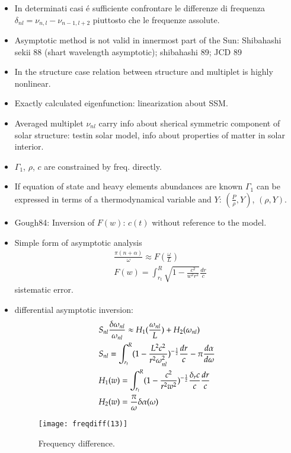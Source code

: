 \documentclass[oneside,12pt,fleqn]{memoir}
\begin{document}
\begin{itemize}
    \item In determinati casi \'e sufficiente confrontare le differenze di frequenza $\delta_{nl}=\nu_{n,l}-\nu_{n-1,l+2}$ piuttosto che le frequenze assolute.
    
    \item Asymptotic method is not valid in innermost part of the Sun: Shibahashi sekii 88 (shart wavelength asymptotic); shibahashi 89; JCD 89 
    
    \item In the structure case relation between structure and multiplet is highly nonlinear.
    \item Exactly calculated eigenfunction: linearization about SSM.
    \item Averaged  multiplet $\nu_{nl}$ carry info about sherical symmetric component of solar structure: testin solar model, info about properties of matter in solar interior.
    \item $\Gamma_1$, $\rho$, $c$ are constrained by freq. directly.
    \item If equation of state and heavy elements abundances are known $\Gamma_1$ can be expressed in terms of a thermodynamical variable and $Y$: $(\frac{P}{\rho},Y)$, $(\rho,Y)$.
    
    \item Gough84:  Inversion of $F(w)$: $c(t)$ without reference to the model.
    
    \item Simple form of asymptotic analysis
    \begin{align*}
    &\frac{\pi(n+\alpha)}{\omega}\approx F(\frac{\omega}{L})\\
    &F(w)=\int_{r_t}^R\sqrt{1-\frac{c^2}{w^2r^2}}\frac{dr}{c}
    \end{align*}
    sistematic error.
    \item differential asymptotic inversion:
    \begin{align*}
    &S_{nl}\frac{\delta\omega_{nl}}{\omega_{nl}}\approx H_1(\frac{\omega_{nl}}{L})+H_2(\omega_{nl})\\
    &S_{nl}=\int_{r_t}^R(1-\frac{L^2c^2}{r^2\omega_{nl}^2})^{-\frac{1}{2}}\frac{dr}{c}-\pi\frac{d \alpha}{d \omega}\\
    &H_1(w)=\int_{r_t}^R(1-\frac{c^2}{r^2w^2})^{-\frac{1}{2}}\frac{\delta_rc}{c}\frac{dr}{c}\\
    &H_2(w)=\frac{\pi}{\omega}\delta\alpha(\omega)
    \end{align*}
    
    \begin{figure}[!ht]
    \centering
    \texttt{[image: freqdiff(13)]}
    \caption{Frequency difference.}
    \end{figure}


\end{itemize}
\end{document}
